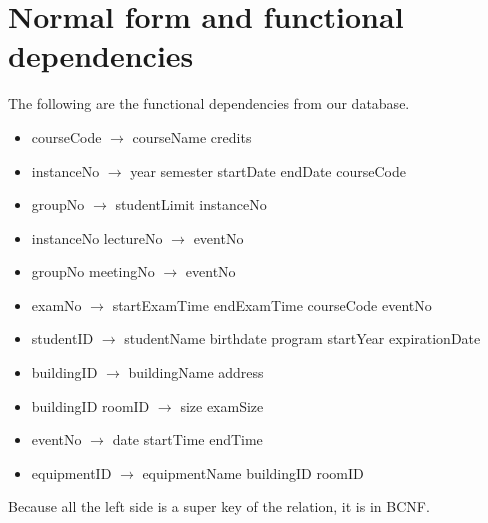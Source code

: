 \documentclass{article}
\begin{document}
\section{Normal form and functional	dependencies}

The following are the functional dependencies from our database.
\begin{itemize}
	\item courseCode $\rightarrow$ courseName credits
\item instanceNo $\rightarrow$ year semester startDate endDate courseCode
\item groupNo $\rightarrow$ studentLimit instanceNo
\item instanceNo lectureNo $\rightarrow$ eventNo
\item groupNo meetingNo $\rightarrow$ eventNo
\item examNo $\rightarrow$ startExamTime endExamTime courseCode eventNo
\item studentID $\rightarrow$ studentName birthdate program startYear expirationDate
\item buildingID $\rightarrow$ buildingName address
\item buildingID roomID $\rightarrow$ size examSize
\item eventNo $\rightarrow$ date startTime endTime
\item equipmentID $\rightarrow$ equipmentName buildingID roomID
\end{itemize}
Because all the left side is a super key of the relation, it is in BCNF.
\end{document}
